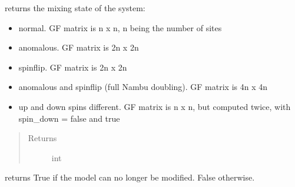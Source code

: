 \documentclass[letterpaper,10pt,english]{sphinxmanual}
\begin{document}
\begin{fulllineitems}
\label{\detokenize{functions:pyqcm.mixing}}
\sphinxAtStartPar
returns the mixing state of the system:
\begin{itemize}
\item {} 
 \textendash{} normal.  GF matrix is n x n, n being the number of sites

\item {} 
 \textendash{} anomalous. GF matrix is 2n x 2n

\item {} 
 \textendash{} spin\sphinxhyphen{}flip.  GF matrix is 2n x 2n

\item {} 
 \textendash{} anomalous and spin\sphinxhyphen{}flip (full Nambu doubling).  GF matrix is 4n x 4n

\item {} 
 \textendash{} up and down spins different.  GF matrix is n x n, but computed twice, with spin\_down = false and true

\end{itemize}
\begin{quote}\begin{description}
\item[{Returns}] \leavevmode
\sphinxAtStartPar
int

\end{description}\end{quote}

\end{fulllineitems}


\begin{fulllineitems}
\label{\detokenize{functions:pyqcm.model_is_closed}}
\sphinxAtStartPar
returns True if the model can no longer be modified. False otherwise.

\end{fulllineitems}

\end{document}
